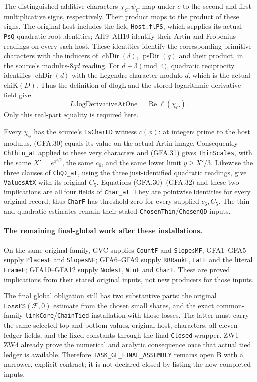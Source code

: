 The distinguished additive characters $\chi_C,\psi_C$ map
under $c$ to the second and first multiplicative signs,
respectively.  Their product maps to the product of these
signs.  The original host includes the field
\texttt{Host.flPS}, which supplies its actual \texttt{PsQ}
quadratic-root identities; AH9--AH10 identify their Artin
and Frobenius readings on every such host.  These identities
identify the corresponding primitive characters with the
inducers of $\operatorname{chDir}(d)$,
$\operatorname{psDir}(q)$ and their product, in the source's
modulus-$8qd$ reading.  For $d\equiv3\pmod4$, quadratic
reciprocity identifies $\operatorname{chDir}(d)$ with the
Legendre character modulo $d$, which is the actual
$\mathrm{chiK}(D)$.  Thus the definition of $\mathrm{dlogL}$
and the stored logarithmic-derivative field give
\[
 L.\mathrm{logDerivativeAtOne}=\operatorname{Re}\ell(\chi_C).
                                                               \tag{GFA.32}
\]
Only this real-part equality is required here.

Every $\chi_\phi$ has the source's \texttt{IsCharED}
witness $c(\phi)$: at integers prime to the host modulus,
(GFA.30) equals its value on the actual Artin image.
Consequently \texttt{ChThin\_at} applied to these very
characters and (GFA.31) gives \texttt{ThinScales}, with the
same $X'=e^{x^{\epsilon/3}}$, the same $c_6$, and the same
lower limit $y\ge X'/3$.
Likewise the three clauses of \texttt{ChQD\_at}, using the
three just-identified quadratic readings, give
\texttt{ValuesAtX} with its original $C_5$.
Equations (GFA.30)--(GFA.32) and these two implications are
all four fields of \texttt{Char\_at}.  They are pointwise
identities for every original record; thus \texttt{CharF}
has threshold zero for every supplied $c_6,C_5$.
The thin and quadratic estimates remain their stated
\texttt{ChosenThin}/\texttt{ChosenQD} inputs.

\paragraph{The remaining final-global work after these installations.}
On the same original family, GVC supplies \texttt{CountF} and
\texttt{SlopesMF}; GFA1--GFA5 supply \texttt{PlacesF} and
\texttt{SlopesNF}; GFA6--GFA9 supply \texttt{RRRankF},
\texttt{LatF} and the literal \texttt{FrameF}; GFA10--GFA12
supply \texttt{NodesF}, \texttt{WinF} and \texttt{CharF}.
These are proved implications from their stated original
inputs, not new producers for those inputs.

The final global obligation still has two substantive parts:
the original $\texttt{LossFS}(\mathcal F,0)$ estimate from
the chosen small shares, and the exact common-family
\texttt{linkCore}/\texttt{ChainTied} installation with those
losses.  The latter must carry the same selected top and
bottom values, original host, characters, all eleven ledger
fields, and the fixed constants through the final
\texttt{Closed} wrapper.  ZW1--ZW4 already prove the numerical
and analytic consequence once that actual tied ledger is
available.  Therefore \texttt{TASK\_GL\_FINAL\_ASSEMBLY}
remains open B with a narrower, explicit contract; it is not
declared closed by listing the now-completed inputs.



